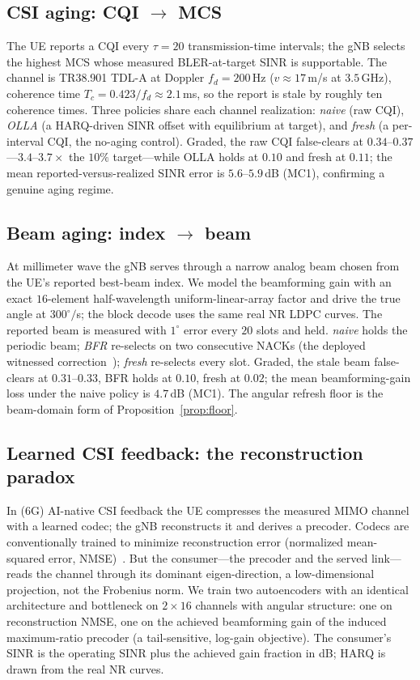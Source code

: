 \documentclass[lettersize,onecolumn]{IEEEtran}
\theoremstyle{remark}
\begin{document}
\subsection{CSI aging: CQI $\to$ MCS}\label{sec:csi}
The UE reports a CQI every $\tau=20$ transmission-time intervals; the gNB selects
the highest MCS whose measured BLER-at-target SINR is supportable. The channel is
TR38.901 TDL-A at Doppler $f_d=200$\,Hz ($v\approx17$\,m/s at $3.5$\,GHz),
coherence time $T_c=0.423/f_d\approx2.1$\,ms, so the report is stale by roughly
ten coherence times. Three policies share each channel realization: \emph{naive}
(raw CQI), \emph{OLLA} (a HARQ-driven SINR offset with equilibrium at target),
and \emph{fresh} (a per-interval CQI, the no-aging control). Graded, the raw CQI
false-clears at $0.34$--$0.37$---$3.4$--$3.7\times$ the $10\%$ target---while OLLA
holds at $0.10$ and fresh at $0.11$; the mean reported-versus-realized SINR error
is $5.6$--$5.9$\,dB (MC1), confirming a genuine aging regime.

\subsection{Beam aging: index $\to$ beam}\label{sec:beam}
At millimeter wave the gNB serves through a narrow analog beam chosen from the
UE's reported best-beam index. We model the beamforming gain with an exact
$16$-element half-wavelength uniform-linear-array factor and drive the true
angle at $300^\circ/$s; the block decode uses the same real NR LDPC curves. The
reported beam is measured with $1^\circ$ error every $20$ slots and held.
\emph{naive} holds the periodic beam; \emph{BFR} re-selects on two consecutive
NACKs (the deployed witnessed correction~\cite{ts38213}); \emph{fresh}
re-selects every slot. Graded, the stale beam false-clears at $0.31$--$0.33$,
BFR holds at $0.10$, fresh at $0.02$; the mean beamforming-gain loss under the
naive policy is $4.7$\,dB (MC1). The angular refresh floor is the beam-domain
form of Proposition~\ref{prop:floor}.

\subsection{Learned CSI feedback: the reconstruction paradox}\label{sec:aicsi}
In (6G) AI-native CSI feedback the UE compresses the measured MIMO channel with a
learned codec; the gNB reconstructs it and derives a precoder. Codecs are
conventionally trained to minimize reconstruction error (normalized mean-squared
error, NMSE)~\cite{wen2018csinet}. But the consumer---the precoder and the served
link---reads the channel through its dominant eigen-direction, a low-dimensional
projection, not the Frobenius norm. We train two autoencoders with an identical
architecture and bottleneck on $2\times16$ channels with angular structure: one on
reconstruction NMSE, one on the achieved beamforming gain of the induced
maximum-ratio precoder (a tail-sensitive, log-gain objective). The consumer's SINR
is the operating SINR plus the achieved gain fraction in dB; HARQ is drawn from the
real NR curves.
\end{document}
